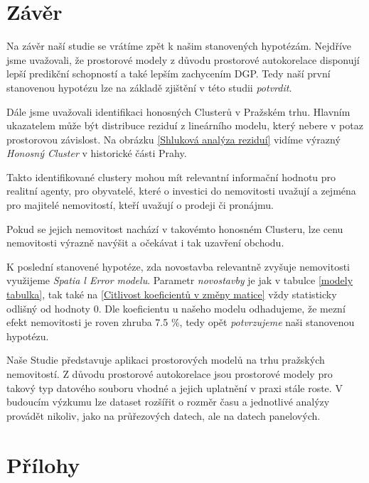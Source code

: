 \documentclass[11pt, a4paper]{article}
\begin{document}
\clearpage

\section{Závěr}

Na závěr naší studie se vrátíme zpět k našim stanovených hypotézám. Nejdříve jsme uvažovali, že prostorové modely z důvodu prostorové autokorelace disponují lepší predikční schopností a také lepším zachycením DGP. Tedy naší první stanovenou hypotézu lze na základě zjištění v této studii \textit{potvrdit}.

Dále jsme uvažovali identifikaci honosných Clusterů v Pražském trhu. Hlavním ukazatelem může být distribuce reziduí z lineárního modelu, který nebere v potaz prostorovou závislost. Na obrázku \ref{Shluková analýza reziduí} vidíme výrazný \textit{Honosný Cluster} v historické části Prahy. 

Takto identifikované clustery mohou mít relevantní informační hodnotu pro realitní agenty, pro obyvatelé, které o investici do nemovitosti uvažují a zejména pro majitelé nemovitostí, kteří uvažují o prodeji či pronájmu. 

Pokud se jejich nemovitost nachází v takovémto honosném Clusteru, lze cenu nemovitosti výrazně navýšit a očekávat i tak uzavření obchodu.

K poslední stanovené hypotéze, zda novostavba relevantně zvyšuje nemovitosti využijeme \textit{Spatia l Error modelu}. Parametr \textit{novostavby} je jak v tabulce \ref{modely tabulka}, tak také na \ref{Citlivost koeficientů v změny matice} vždy statisticky odlišný od hodnoty $0.$ Dle koeficientu u našeho modelu odhadujeme, že mezní efekt nemovitosti je roven zhruba 7.5 \%, tedy opět \textit{potvrzujeme} naši stanovenou hypotézu.


Naše Studie představuje aplikaci prostorových modelů na trhu pražských nemovitostí. Z důvodu prostorové autokorelace jsou prostorové modely pro takový typ datového souboru vhodné a jejich uplatnění v praxi stále roste. V budoucím výzkumu lze dataset rozšířit o rozměr času a jednotlivé analýzy provádět nikoliv, jako na průřezových datech, ale na datech panelových.






\clearpage
\section{Přílohy} \label{Přílohy}
\end{document}
